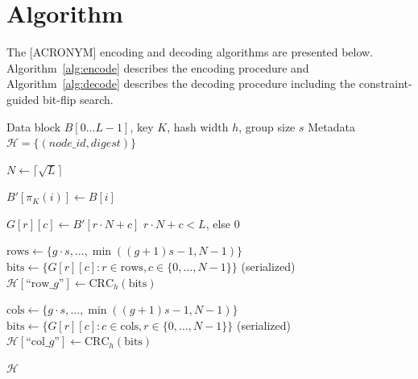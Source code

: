 \chapter*{Algorithm}
\noindent

The [ACRONYM] encoding and decoding algorithms are presented below. Algorithm~\ref{alg:encode} describes the encoding procedure and Algorithm~\ref{alg:decode} describes the decoding procedure including the constraint-guided bit-flip search.

\begin{algorithm}
\caption{[ACRONYM] Encoder}
\label{alg:encode}
\begin{algorithmic}[1]
\Require Data block $B[0 \ldots L-1]$, key $K$, hash width $h$, group size $s$
\Ensure Metadata $\mathcal{H} = \{(node\_id, digest)\}$

\State $N \leftarrow \lceil\sqrt{L}\rceil$

    \State $B'[\pi_K(i)] \leftarrow B[i]$ 
\EndFor

    \State $G[r][c] \leftarrow B'[r \cdot N + c]$  $r \cdot N + c < L$, else $0$
\EndFor

    \State $\text{rows} \leftarrow \{g \cdot s, \ldots, \min((g+1)s-1, N-1)\}$
    \State $\text{bits} \leftarrow \{G[r][c] : r \in \text{rows}, c \in \{0,\ldots,N-1\}\}$ (serialized)
    \State $\mathcal{H}[\text{``row\_}g\text{''}] \leftarrow \text{CRC}_h(\text{bits})$
\EndFor

    \State $\text{cols} \leftarrow \{g \cdot s, \ldots, \min((g+1)s-1, N-1)\}$
    \State $\text{bits} \leftarrow \{G[r][c] : c \in \text{cols}, r \in \{0,\ldots,N-1\}\}$ (serialized)
    \State $\mathcal{H}[\text{``col\_}g\text{''}] \leftarrow \text{CRC}_h(\text{bits})$
\EndFor

\State \Return $\mathcal{H}$
\end{algorithmic}
\end{algorithm}

